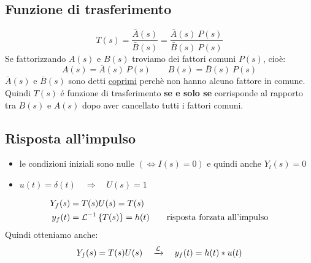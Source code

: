 \documentclass[../main.tex]{subfiles}
\begin{document}
	\subsection{Funzione di trasferimento}
	\[ T(s) = \frac{\bar{A}(s)}{\bar{B}(s)} = \frac{\bar{A}(s)\ P(s)}{\bar{B}(s)\ P(s)} \]
	Se fattorizzando $ A(s) $ e $ B(s) $ troviamo dei fattori comuni $ P(s) $, cio\`{e}:
	\[ A(s) = \bar{A}(s)\ P(s) \qquad B(s) = \bar{B}(s)\ P(s) \]
	$ \bar{A}(s) $ e $ \bar{B}(s) $ sono detti \underline{coprimi} perch\`{e} non hanno alcuno fattore in comune.\\
	Quindi $ T(s) $ \'{e} funzione di trasferimento \textbf{se e solo se} corrisponde al rapporto tra $ B(s) $ e $ A(s) $ dopo aver cancellato tutti i fattori comuni.
	\subsection{Risposta all'impulso}
	\begin{itemize}
		\item le condizioni iniziali sono nulle $ (\Leftrightarrow I(s) = 0 ) $ e quindi anche $ Y_l(s) = 0 $
		\item $ u(t) = \delta(t) \quad \Rightarrow \quad U(s) = 1 $
	\end{itemize}
	\begin{align*}
		Y_f(s) &= T(s)U(s) = T(s)\\
		y_f(t) &= \mathcal{L}^{-1} \left\lbrace T(s) \right\rbrace = h(t) \qquad \text{risposta forzata all'impulso}
	\end{align*}
	Quindi otteniamo anche:
	\[ Y_f(s) = T(s)U(s) \quad \xrightarrow{\mathcal{L}} \quad y_f(t) = h(t) * u(t) \]
\end{document}
